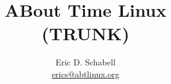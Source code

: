 \documentclass[a4paper]{article}
\begin{document}
\title{ABout Time Linux \\ (TRUNK)}

\author{Eric D. Schabell \\ \url{erics@abtlinux.org}}

\maketitle









  
\end{document}
